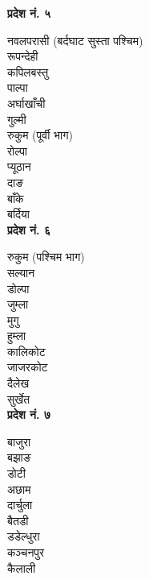 \begin{multicols*}{2}
\textbf{प्रदेश नं. ५}

नवलपरासी (बर्दघाट सुस्ता पश्चिम)\\
रूपन्देही\\
कपिलबस्तु\\
पाल्पा\\
अर्घाखाँची\\
गुल्मी\\
रुकुम (पूर्वी भाग)\\
रोल्पा\\
प्यूठान\\
दाङ\\
बाँके\\
बर्दिया\\

\textbf{प्रदेश नं. ६}

रुकुम (पश्चिम भाग)\\
सल्यान\\
डोल्पा\\
जुम्ला\\
मुगु\\
हुम्ला\\
कालिकोट\\
जाजरकोट\\
दैलेख\\
सुर्खेत\\

\textbf{प्रदेश नं. ७}

बाजुरा\\
बझाङ\\
डोटी\\
अछाम\\
दार्चुला\\
बैतडी\\
डडेल्धुरा\\
कञ्चनपुर\\
कैलाली\\

\end{multicols*}
